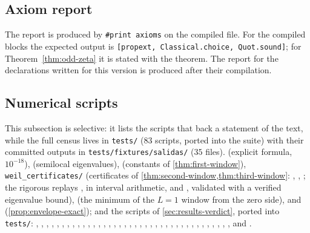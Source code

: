 \subsection{Axiom report}
The report is produced by \texttt{\#print axioms} on the compiled file.  For the
compiled blocks the expected output is \texttt{[propext, Classical.choice, Quot.sound]};
for Theorem~\ref{thm:odd-zeta} it is stated with the theorem.  The report for the
declarations written for this version is produced after their compilation.

\subsection{Numerical scripts}
This subsection is selective: it lists the scripts that back a statement of the
text, while the full census lives in \texttt{tests/} ($83$ scripts, ported into the
suite) with their committed outputs in \texttt{tests/fixtures/salidas/} ($35$ files).
 (explicit formula, $10^{-18}$),
 (semilocal eigenvalues),
 (constants of
\cref{thm:first-window}), \texttt{weil\_certificates/} (certificates of
\cref{thm:second-window,thm:third-window}: , ,
; the rigorous replays , in interval arithmetic, and , validated with a verified eigenvalue bound),  (the minimum of the $L=1$ window
from the zero side),  and 
(\cref{prop:envelope-exact}); and the scripts of \cref{sec:results-verdict}, ported into \texttt{tests/}:
, , , ,
, , , , ,
, , , ,
, , ,
, , , ,
, , , , , , , , , , , , , , , , , ,  and .

